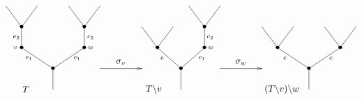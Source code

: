 \documentclass[../main.tex]{subfiles}
\begin{document}
\begin{equation}
    \xy
    <0.08cm, 0cm>:
    (0.0, 0.0)*{}="1"; %
    (0.0, 10.0)*=0{\bullet}="2"; %
    (-15.0, 20.0)*=0{\bullet}="3"; %
    (-15.0, 30.0)*=0{\bullet}="4"; %
    (-22.5, 40.0)*{}="5"; %
    (-7.5, 40.0)*{}="6"; %
    (15.0, 20.0)*=0{\bullet}="7"; %
    (15.0, 30.0)*=0{\bullet}="8"; %
    (7.5, 40.0)*{}="9"; %
    (22.5, 40.0)*{}="10"; %
    "1";"2" **\dir{-};
    "2";"3" **\dir{-};
    "3";"4" **\dir{-};
    "4";"5" **\dir{-};
    "4";"6" **\dir{-};
    "2";"7" **\dir{-};
    "7";"8" **\dir{-};
    "8";"9" **\dir{-};
    "8";"10" **\dir{-};
    (-18.0, 20.0)*=0{\scriptstyle v};
    (18.0, 20.0)*=0{\scriptstyle w};
    (-11.5, 15.0)*=0{\scriptstyle e_1};
    (-17.5, 25.0)*=0{\scriptstyle e_2};
    (11.5, 15.0)*=0{\scriptstyle c_1};
    (18, 25.0)*=0{\scriptstyle c_2};
    (-13,0)*{T};
    \endxy
    \xy
    <0.08cm, 0cm>:
    (-10, 0.0)*{}="1";
    (10, 0.0)*{}="2";
    (10, 10)*{}="3";
    (-10, 0)*{}="4";
    {\ar(-10, 10)*{};(10,10)*{}};
    (0,13)*{\sigma_v};
    \endxy
    \xy
    <0.08cm, 0cm>:
    (0.0, 0.0)*{}="1"; %
    (0.0, 10.0)*=0{\bullet}="2"; %
    (-11.25, 20.0)*=0{\bullet}="3"; %
    (-18.75, 30.0)*{}="4"; %
    (-3.75, 30.0)*{}="5"; %
    (11.25, 20.0)*=0{\bullet}="6"; %
    (11.25, 30.0)*=0{\bullet}="7"; %
    (3.75, 40.0)*{}="8"; %
    (18.75, 40.0)*{}="9"; %
    "1";"2" **\dir{-};
    "2";"3" **\dir{-};
    "3";"4" **\dir{-};
    "3";"5" **\dir{-};
    "2";"6" **\dir{-};
    "6";"7" **\dir{-};
    "7";"8" **\dir{-};
    "7";"9" **\dir{-};
    (14.25, 20.0)*=0{\scriptstyle w};
    (-9, 15.0)*=0{\scriptstyle e};
    (10, 15.0)*=0{\scriptstyle c_1};
    (14, 25.0)*=0{\scriptstyle c_2};
    (-13,0)*{T\backslash v};
    \endxy
    \xy
    <0.08cm, 0cm>:
    (-10, 0.0)*{}="1";
    (10, 0.0)*{}="2";
    (10, 10)*{}="3";
    (-10, 0)*{}="4";
    {\ar(-10, 10)*{};(10,10)*{}};
    (0,13)*{\sigma_w};
    \endxy
    \xy
    <0.08cm, 0cm>:
    (0.0, 0.0)*{}="1"; %
    (0.0, 10.0)*=0{\bullet}="2"; %
    (-15.0, 20.0)*=0{\bullet}="3"; %
    (-22.5, 30.0)*{}="4"; %
    (-7.5, 30.0)*{}="5"; %
    (15.0, 20.0)*=0{\bullet}="6"; %
    (7.5, 30.0)*{}="7"; %
    (22.5, 30.0)*{}="8"; %
    "1";"2" **\dir{-};
    "2";"3" **\dir{-};
    "3";"4" **\dir{-};
    "3";"5" **\dir{-};
    "2";"6" **\dir{-};
    "6";"7" **\dir{-};
    "6";"8" **\dir{-};
    (-11.5, 15.0)*=0{\scriptstyle e};
    (10.5, 15.0)*=0{\scriptstyle c};
    (-13,0)*{(T\backslash v)\backslash w};
    \endxy
\end{equation}
\end{document}
